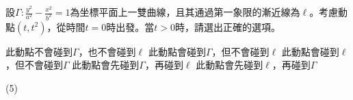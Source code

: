 \begin{QUESTION}
    \begin{QBODY}
        設$\Gamma :\frac{{{y}^{2}}}{{{a}^{2}}}-\frac{{{x}^{2}}}{{{b}^{2}}}=1$為坐標平面上一雙曲線，且其通過第一象限的漸近線為$\ell $。考慮動點$(t,{{t}^{2}})$，從時間$t=0$時出發。當$t>0$時，請選出正確的選項。
        \begin{QOPS}
        \QOP 此動點不會碰到$\Gamma $，也不會碰到$\ell $
        \QOP 此動點會碰到$\Gamma $，但不會碰到$\ell $
        \QOP 此動點會碰到$\ell $，但不會碰到$\Gamma $
        \QOP 此動點會先碰到$\Gamma $，再碰到$\ell $
        \QOP 此動點會先碰到$\ell $，再碰到$\Gamma $
        \end{QOPS}
    \end{QBODY}
    \begin{QFROMS}
    \end{QFROMS}
    \begin{QTAGS}
    \end{QTAGS}
    \begin{QANS}
        (5)
    \end{QANS}
    \begin{QSOL}
    \end{QSOL}
    \begin{QEMPTYSPACE}
    \end{QEMPTYSPACE}
\end{QUESTION}
